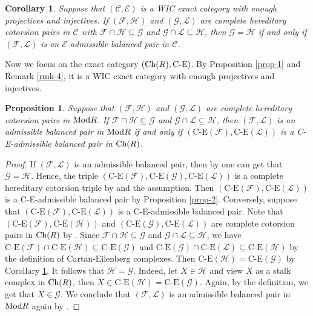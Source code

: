 \documentclass[reqno,12pt]{amsart}
\numberwithin{equation}{section}
\def\Ch{\mbox{\rm Ch}}
\theoremstyle{plain}
\newtheorem{corollary}[theorem]{\bf Corollary}
\newtheorem{proposition}[theorem]{\bf Proposition}
\theoremstyle{definition}
\newcommand{\CE}{\mathrm{C}\text{-}\mathrm{E}}
\begin{document}
\begin{corollary}\label{coro-2}
    Suppose that $(\mathcal{C},\mathcal{E})$ is a WIC exact category with enough projectives and injectives. If $(\mathcal{F},\mathcal{H})$ and $(\mathcal{G},\mathcal{L})$ are complete hereditary cotorsion pairs in $\mathcal{C}$ with $\mathcal{F}\cap\mathcal{H}\subseteq\mathcal{G}$ and $\mathcal{G}\cap\mathcal{L}\subseteq\mathcal{H}$, then $\mathcal{G}=\mathcal{H}$ if and only if $(\mathcal{F},\mathcal{L})$ is an $\mathcal{E}$-admissible balanced pair in $\mathcal{C}$.
\end{corollary}

Now we focus on the exact category $(\Ch(R),\text{C-E})$. By Proposition \ref{prop-1} and Remark \ref{rmk-4}, it is a WIC exact category with enough projectives and injectives.

\begin{proposition}\label{prop-10}
    Suppose that $(\mathcal{F},\mathcal{H})$ and $(\mathcal{G},\mathcal{L})$ are complete hereditary cotorsion pairs in $\mbox{\rm Mod} R$. If $\mathcal{F}\cap\mathcal{H}\subseteq\mathcal{G}$ and $\mathcal{G}\cap\mathcal{L}\subseteq\mathcal{H}$, then $(\mathcal{F},\mathcal{L})$ is an admissible balanced pair in $\mbox{\rm Mod} R$ if and only if $(\CE(\mathcal{F}),\CE(\mathcal{L}))$ is a C-E-admissible balanced pair in $\Ch(R)$.
\end{proposition}
\begin{proof}
    If $(\mathcal{F},\mathcal{L})$ is an admissible balanced pair,
    then by \cite[Corollary 4.8]{EPZ20} one can get that $\mathcal{G}=\mathcal{H}$. Hence, the
    triple $(\text{C-E}(\mathcal{F}),\text{C-E}(\mathcal{G}),\text{C-E}(\mathcal{L}))$ is a
    complete hereditary cotorsion triple by \cite[Theorem 3.9]{YL14-1} and the assumption.
    Then $(\text{C-E}(\mathcal{F}),\text{C-E}(\mathcal{L}))$ is a C-E-admissible balanced pair
    by Proposition \ref{prop-2}.
    Conversely, suppose that $(\text{C-E}(\mathcal{F}),\text{C-E}(\mathcal{L}))$ is a
    C-E-admissible balanced pair. Note that
    $(\text{C-E}(\mathcal{F}),\text{C-E}(\mathcal{H}))$ and $(\text{C-E}(\mathcal{G}),\text{C-E}(\mathcal{L}))$
    are complete cotorsion pairs in $\Ch(R)$ by \cite[Theorem 3.9]{YL14-1}.
    Since $\mathcal{F}\cap\mathcal{H}\subseteq\mathcal{G}$ and $\mathcal{G}\cap\mathcal{L}\subseteq\mathcal{H}$,
    we have $\text{C-E}(\mathcal{F})\cap \text{C-E}(\mathcal{H})\subseteq \text{C-E}(\mathcal{G})$
    and $\text{C-E}(\mathcal{G})\cap \text{C-E}(\mathcal{L})\subseteq \text{C-E}(\mathcal{H})$
    by the definition of Cartan-Eilenberg complexes.
    Then $\text{C-E}(\mathcal{H})=\text{C-E}(\mathcal{G})$ by Corollary \ref{coro-2}.
    It follows that $\mathcal{H}=\mathcal{G}$. Indeed, let $X\in\mathcal{H}$ and view $X$ as a stalk complex in $\Ch(R)$,
    then $X\in \text{C-E}(\mathcal{H})=\text{C-E}(\mathcal{G})$.
    Again, by the definition, we get that $X\in\mathcal{G}$.
    We conclude that $(\mathcal{F},\mathcal{L})$ is an admissible balanced pair in $\mbox{\rm Mod} R$ again by \cite[Corollary 4.8]{EPZ20}.
\end{proof}
\end{document}
